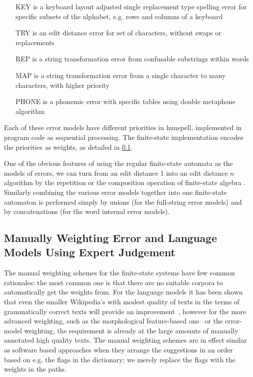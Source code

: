 \documentclass[a4paper,12pt]{article}
\begin{document}
\begin{itemize}
    \item[KEY] is a keyboard layout adjusted single replacement type spelling
        error for specific subsets of the alphabet, e.g. rows and columns of a
        keyboard
    \item[TRY] is an edit distance error for set of characters, without swaps
        or replacements
    \item[REP] is a string transformation error from confusable substrings
        within words
    \item[MAP] is a string transformation error from a single character to 
        many characters, with higher priority
    \item[PHONE] is a phonemic error with specific tables using double
        metaphone algorithm
\end{itemize}

Each of these error models have different priorities in hunspell, implemented
in program code as sequential processing. The finite-state implementation
encodes the priorities as weights, as detailed in
\ref{subsec:manual-weighting}.

One of the obvious features of using the regular finite-state automata as the
models of errors, we can turn from an edit distance 1 into an edit distance $n$
algorithm by the repetition or the composition operation of finite-state
algebra \cite[]{pirinen2012effects}.  Similarly combining the various error
models together into one finite-state automaton is performed simply by unions
(for the full-string error models) and by concatenations (for the word internal
error models).

\subsection{Manually Weighting Error and Language Models Using Expert
Judgement}
\label{subsec:manual-weighting}


The manual weighting schemes for the finite-state systems have few common
rationales: the most common one is that there are no suitable corpora to
automatically get the weights from. For the language models it has been shown
that even the smaller Wikipedia's with modest quality of texts in the terms of
grammatically correct texts will provide an
improvement~\cite[]{pirinen/2010/lrec}, however for the more advanced
weighting, such as the morphological feature-based
one~\cite[]{pirinen2012improving} or the error-model weighting, the requirement
is already at the large amounts of manually annotated high quality texts. The
manual weighting schemes are in effect similar as software based approaches
when they arrange the suggestions in an order based on e.g. the flags in the
dictionary; we merely replace the flags with the weights in the paths.
\end{document}
